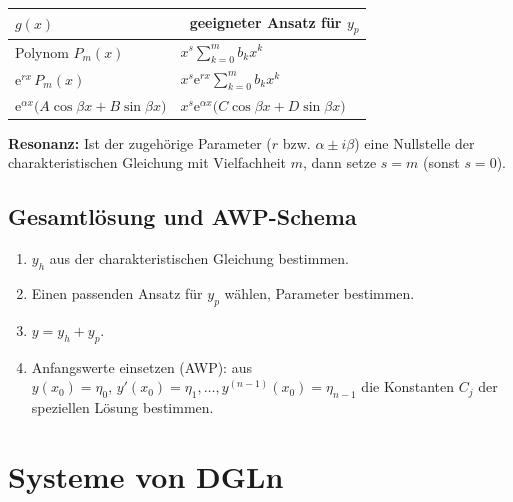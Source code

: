\documentclass[a4paper,11pt,oneside,open=any,parskip=half, DIV=15]{scrreprt}
\begin{document}
      \begin{importantbox}    
         \begin{center}       
         \begin{tabular}{ll}
            \(g(x)\) & \(\;\) geeigneter Ansatz für \(y_p\) \\ \hline   %
            Polynom \(P_m(x)\) & \(x^{s}\displaystyle\sum_{k=0}^{m} b_k x^k\) \\
            \(\mathrm e^{rx}\,P_m(x)\) & \(x^{s}\mathrm e^{rx}\displaystyle\sum_{k=0}^{m} b_k x^k\) \\
            \(\mathrm e^{\alpha x}\bigl(A\cos\beta x+B\sin\beta x\bigr)\) 
            & \(x^{s}\mathrm e^{\alpha x}\bigl(C\cos\beta x+D\sin\beta x\bigr)\) \\
         \end{tabular}
         \end{center}
      \end{importantbox}
      \noindent
      \textbf{Resonanz:} Ist der zugehörige Parameter (\(r\) bzw. \(\alpha\pm i\beta\)) eine Nullstelle der charakteristischen Gleichung mit Vielfachheit \(m\), dann setze \(s=m\) (sonst \(s=0\)).  %

   \subsection*{Gesamtlösung und AWP-Schema}
      \begin{enumerate}[leftmargin=1.2em]
      \item \(y_h\) aus der charakteristischen Gleichung bestimmen.
      \item Einen passenden Ansatz für \(y_p\) wählen, Parameter bestimmen.
      \item \(\displaystyle y = y_h + y_p\).
      \item Anfangswerte einsetzen (AWP): aus \(y(x_0)=\eta_0,\,y'(x_0)=\eta_1,\dots, y^{(n-1)}(x_0)=\eta_{n-1}\)
            die Konstanten \(C_j\) der speziellen Lösung bestimmen.
      \end{enumerate}

\section{Systeme von DGLn}
\end{document}
